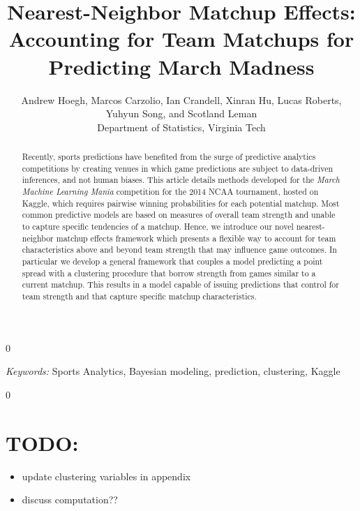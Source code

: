 \documentclass[letterpaper,12pt]{article}
\newcommand{\blind}{0}
\begin{document}
\blind
{
\title{Nearest-Neighbor Matchup Effects:  Accounting for Team Matchups for Predicting March Madness}
 \author{Andrew Hoegh, Marcos Carzolio, Ian Crandell, Xinran Hu, Lucas Roberts, \\Yuhyun Song, and Scotland Leman\\
 Department of Statistics, Virginia Tech}        
  \originalmaketitle
  \begin{abstract} 
\noindent
Recently, sports predictions have benefited from the surge of predictive analytics competitions by creating venues in which game predictions are subject to data-driven inferences, and not human biases. This article details methods developed for the \emph{March Machine Learning Mania} competition for the 2014 NCAA tournament, hosted on Kaggle, which requires pairwise winning probabilities for each potential matchup. Most common predictive models are based on measures of overall team strength and unable to capture specific tendencies of a matchup. Hence, we introduce our novel nearest-neighbor matchup effects framework which presents a flexible way to account for team characteristics above and beyond team strength that may influence game outcomes. In particular we develop a general framework that couples a model predicting a point spread with a clustering procedure that borrow strength from games similar to a current matchup. This results in a model capable of issuing predictions that control for team strength and that capture specific matchup characteristics.
\end{abstract}

\noindent%
{\it Keywords:}  Sports Analytics, Bayesian modeling, prediction, clustering, Kaggle

} \fi

\blind
{
} \fi

\newpage



\section*{TODO:}
\begin{itemize}
\item update clustering variables in appendix
\item discuss computation??
\end{itemize}
\end{document}
